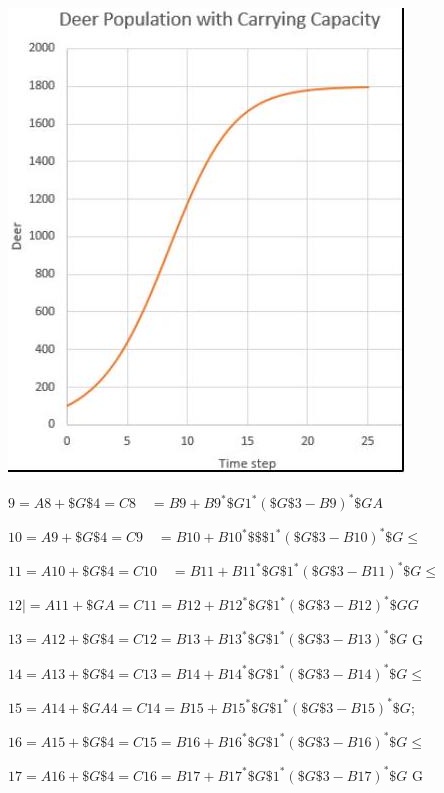 \documentclass[10pt]{article}
\begin{document}
\includegraphics[max width=\textwidth]{2022_07_05_5945264bba2a5f6ba667g-12(1)}

$9=A 8+\$ G \$ 4=C 8 \quad=B 9+B 9^{*} \$ G 1^{*}(\$ G \$ 3-B 9)^{*} \$ G A$

$10=A 9+\$ G \$ 4=C 9 \quad=B 10+B 10^{*} \$ \$ \$ 1^{*}(\$ G \$ 3-B 10)^{*} \$ G \leqslant$

$11=A 10+\$ G \$ 4=C 10 \quad=B 11+B 11^{*} \$ G \$ 1^{*}(\$ G \$ 3-B 11)^{*} \$ G \leqslant$

$12 \mid=A 11+\$ G A=C 11=B 12+B 12^{*} \$ G \$ 1^{*}(\$ G \$ 3-B 12)^{*} \$ G G$

$13=A 12+\$ G \$ 4=C 12=B 13+B 13^{*} \$ G \$ 1^{*}(\$ G \$ 3-B 13)^{*} \$ G$ G

$14=A 13+\$ G \$ 4=C 13=B 14+B 14^{*} \$ G \$ 1^{*}(\$ G \$ 3-B 14)^{*} \$ G \leqslant$

$15=A 14+\$ G A 4=C 14=B 15+B 15^{*} \$ G \$ 1^{*}(\$ G \$ 3-B 15)^{*} \$ G$;

$16=A 15+\$ G \$ 4=C 15=B 16+B 16^{*} \$ G \$ 1^{*}(\$ G \$ 3-B 16)^{*} \$ G \leqslant$

$17=A 16+\$ G \$ 4=C 16=B 17+B 17^{*} \$ G \$ 1^{*}(\$ G \$ 3-B 17)^{*} \$ G$ G
\end{document}
